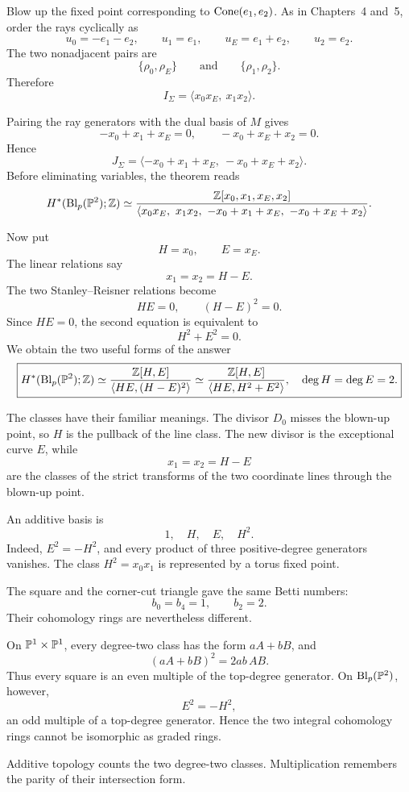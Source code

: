 \begin{example}
\label{ex:cohomology-ring-blowup-projective-plane}
Blow up the fixed point corresponding to \(\operatorname{Cone}(e_1,e_2)\). As in
Chapters~4 and~5, order the rays cyclically as
\[
u_0=-e_1-e_2,
\qquad
u_1=e_1,
\qquad
u_E=e_1+e_2,
\qquad
u_2=e_2.
\]
The two nonadjacent pairs are
\[
\{\rho_0,\rho_E\}
\qquad\text{and}\qquad
\{\rho_1,\rho_2\}.
\]
Therefore
\[
I_\Sigma
=
\langle x_0x_E,\ x_1x_2\rangle.
\]

Pairing the ray generators with the dual basis of \(M\) gives
\[
-x_0+x_1+x_E=0,
\qquad
-x_0+x_E+x_2=0.
\]
Hence
\[
J_\Sigma
=
\langle-x_0+x_1+x_E,\ -x_0+x_E+x_2\rangle.
\]
Before eliminating variables, the theorem reads
\[
H^*(\operatorname{Bl}_p(\mathbb{P}^2);\mathbb{Z})
\simeq
\frac{\mathbb{Z}[x_0,x_1,x_E,x_2]}
{\langle
x_0x_E,\ x_1x_2,\
-x_0+x_1+x_E,\ -x_0+x_E+x_2
\rangle}.
\]

Now put
\[
H=x_0,
\qquad
E=x_E.
\]
The linear relations say
\[
x_1=x_2=H-E.
\]
The two Stanley--Reisner relations become
\[
HE=0,
\qquad
(H-E)^2=0.
\]
Since \(HE=0\), the second equation is equivalent to
\[
H^2+E^2=0.
\]
We obtain the two useful forms of the answer
\[
\boxed{
H^*(\operatorname{Bl}_p(\mathbb{P}^2);\mathbb{Z})
\simeq
\frac{\mathbb{Z}[H,E]}{\langle HE,(H-E)^2\rangle}
\simeq
\frac{\mathbb{Z}[H,E]}{\langle HE,H^2+E^2\rangle},
\quad
\deg H=\deg E=2.
}
\]

The classes have their familiar meanings. The divisor \(D_0\) misses
the blown-up point, so \(H\) is the pullback of the line class. The new
divisor is the exceptional curve \(E\), while
\[
x_1=x_2=H-E
\]
are the classes of the strict transforms of the two coordinate lines
through the blown-up point.

An additive basis is
\[
1,\quad H,\quad E,\quad H^2.
\]
Indeed, \(E^2=-H^2\), and every product of three positive-degree
generators vanishes. The class \(H^2=x_0x_1\) is represented by a
torus fixed point.
\end{example}

\begin{surfacelaboratory}
The square and the corner-cut triangle gave the same Betti numbers:
\[
b_0=b_4=1,
\qquad
b_2=2.
\]
Their cohomology rings are nevertheless different.

On \(\mathbb{P}^1\times\mathbb{P}^1\), every degree-two class has the form
\(aA+bB\), and
\[
(aA+bB)^2=2ab\,AB.
\]
Thus every square is an even multiple of the top-degree generator. On
\(\operatorname{Bl}_p(\mathbb{P}^2)\), however,
\[
E^2=-H^2,
\]
an odd multiple of a top-degree generator. Hence the two integral
cohomology rings cannot be isomorphic as graded rings.

Additive topology counts the two degree-two classes. Multiplication
remembers the parity of their intersection form.
\end{surfacelaboratory}

